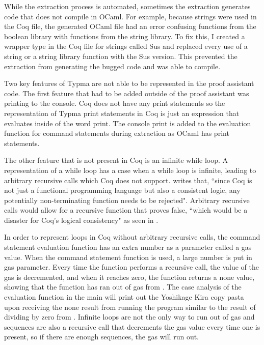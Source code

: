 \documentclass[10pt,twocolumn]{article}
\begin{document}
While the extraction process is automated, sometimes the extraction generates code that does not compile in OCaml. For example, because strings were used in the Coq file, the generated OCaml file had an error confusing functions from the boolean library with functions from the string library. To fix this, I created a wrapper type in the Coq file for strings called Sus and replaced every use of a string or a string library function with the Sus version. This prevented the extraction from generating the bugged code and was able to compile.

Two key features of Typma are not able to be represented in the proof assistant code. The first feature that had to be added outside of the proof assistant was printing to the console. Coq does not have any print statements so the representation of Typma print statements in Coq is just an expression that evaluates inside of the word print. The console print is added to the evaluation function for command statements during extraction as OCaml has print statements. 

The other feature that is not present in Coq is an infinite while loop. A representation of a while loop has a case when a while loop is infinite, leading to arbitrary recursive calls which Coq does not support. \textcite{Pierce2021Software} writes that, ``since Coq is not just a functional programming language but also a consistent logic, any potentially non-terminating function needs to be rejected". Arbitrary recursive calls would allow for a recursive function that proves false, ``which would be a disaster for Coq's logical consistency" as seen in \textcite{Pierce2021Software}. 

In order to represent loops in Coq without arbitrary recursive calls, the command statement evaluation function has an extra number as a parameter called a gas value. When the command statement function is used, a large number is put in gas parameter. Every time the function performs a recursive call, the value of the gas is decremented, and when it reaches zero, the function returns a none value, showing that the function has ran out of gas from \textcite{Pierce2021Software}. The case analysis of the evaluation function in the main will print out the Yoshikage Kira copy pasta upon receiving the none result from running the program similar to the result of dividing by zero from \textcite{kira}. Infinite loops are not the only way to run out of gas and sequences are also a recursive call that decrements the gas value every time one is present, so if there are enough sequences, the gas will run out. 
\end{document}
